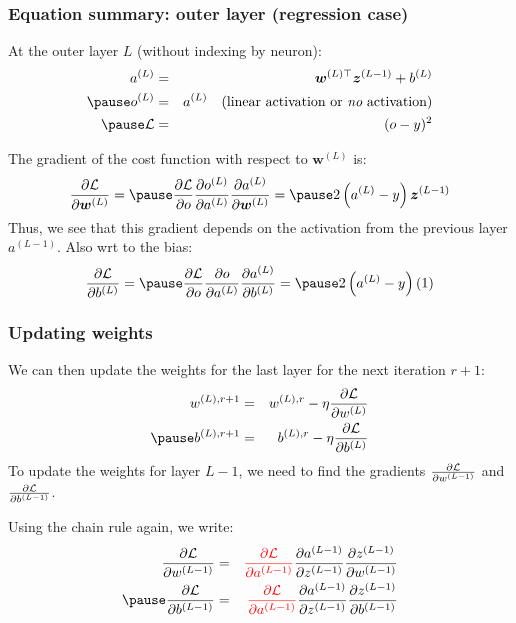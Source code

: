 \documentclass[smaller]{beamer}
\begin{document}
\begin{frame}
  \frametitle{Equation summary: outer layer (regression case)}
  \pause
  At the outer layer $L$ (without indexing by neuron):\pause
  \begin{eqnarray}
    a^{(L)} &=& \bm w^{(L)\top} \bm z^{(L-1)} + b^{(L)} \\\pause
    o^{(L)} &=& a^{(L)}  \quad \text{(linear activation or {\it no} activation)} \\\pause
    \mc{L} &=& (o  - y)^2
  \end{eqnarray}
  \pause
  
  The gradient of the cost function with respect to $\bm w^{(L)}$ is:\pause
  \begin{equation}
    \frac{\partial \mc{L}}{\partial \bm w^{(L)}}
    =\pause
    \frac{\partial \mc{L}}{\partial  o}
    \frac{\partial o^{(L)}}{\partial a^{(L)}}
    \frac{\partial a^{(L)}}{\partial \bm w^{(L)}}
    =\pause
    2 \left(a^{(L)} - y \right) \bm z^{(L-1)}
  \end{equation}
  \pause
  Thus, we see that this gradient depends on the activation from the previous layer $a^{(L-1)}$. \pause Also wrt to the bias:
  \begin{equation}
    \pd{\mc{L}}{b^{(L)}} = \pause \pd{\mc{L}}{o}\pd{o}{a^{(L)}}\pd{a^{(L)}}{b^{(L)}} =\pause 2\lt(a^{(L)} - y\rt)(1)
  \end{equation}
\end{frame}

\begin{frame}
  \frametitle{Updating weights}
  \pause
  We can then update the weights for the last layer for the next iteration $r+1$:\pause
  \begin{eqnarray}
    w^{(L), r+1}  &=&  w^{(L),r} - \eta \pd{\mc{L}}{w^{(L)}}  \\\pause
    b^{(L), r+1}  &=&  b^{(L),r} - \eta \pd{\mc{L}}{b^{(L)}}  
  \end{eqnarray}
  \pause
  To update the weights for layer $L-1$, we need to find the gradients $\frac{\partial{\mathcal{L}}}{\partial{w^{(L-1)}}}$ and $\frac{\partial{\mathcal{L}}}{\partial{b^{(L-1)}}}$.

  \pause

  \medskip
  
  Using the chain rule again, we write:\pause
  \begin{eqnarray}
    \pd{\mc{L}}{w^{(L-1)}} &=& {\rd \pd{\mc{L}}{a^{(L-1)}}}\pd{a^{(L-1)}}{z^{(L-1)}}\pd{z^{(L-1)}}{w^{(L-1)}} \\\pause
    \pd{\mc{L}}{b^{(L-1)}} &=& {\rd \pd{\mc{L}}{a^{(L-1)}}}\pd{a^{(L-1)}}{z^{(L-1)}}\pd{z^{(L-1)}}{b^{(L-1)}} 
  \end{eqnarray}
\end{frame}
\end{document}
